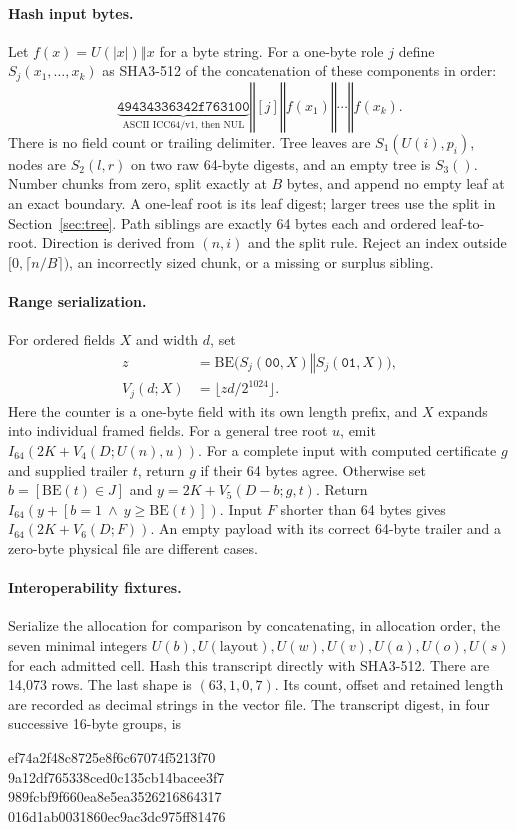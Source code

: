 \documentclass[10pt,twocolumn,letterpaper]{article}
\newcommand{\cat}{\mathbin\Vert}
\begin{document}
\paragraph{Hash input bytes.}
Let \(f(x)=U(|x|)\cat x\) for a byte string. For a one-byte role \(j\) define \(S_j(x_1,\ldots,x_k)\) as SHA3-512 of the concatenation of these components in order:
\[
 \underbrace{\mathtt{49434336342f763100}}_{\text{ASCII ICC64/v1, then NUL}}
 \cat [j]\cat f(x_1)\cat\cdots\cat f(x_k).
\]
There is no field count or trailing delimiter. Tree leaves are \(S_1(U(i),p_i)\), nodes are \(S_2(l,r)\) on two raw 64-byte digests, and an empty tree is \(S_3()\). Number chunks from zero, split exactly at \(B\) bytes, and append no empty leaf at an exact boundary. A one-leaf root is its leaf digest; larger trees use the split in Section~\ref{sec:tree}. Path siblings are exactly 64 bytes each and ordered leaf-to-root. Direction is derived from \((n,i)\) and the split rule. Reject an index outside \([0,\lceil n/B\rceil)\), an incorrectly sized chunk, or a missing or surplus sibling.

\paragraph{Range serialization.}
For ordered fields \(X\) and width \(d\), set
\begin{align*}
 z&=\mathrm{BE}\big(S_j(\mathtt{00},X)\cat S_j(\mathtt{01},X)\big),\\
 V_j(d;X)&=\lfloor zd/2^{1024}\rfloor .
\end{align*}
Here the counter is a one-byte field with its own length prefix, and \(X\) expands into individual framed fields. For a general tree root \(u\), emit \(I_{64}(2K+V_4(D;U(n),u))\). For a complete input with computed certificate \(g\) and supplied trailer \(t\), return \(g\) if their 64 bytes agree. Otherwise set \(b=[\mathrm{BE}(t)\in J]\) and \(y=2K+V_5(D-b;g,t)\). Return \(I_{64}(y+[b=1\ \land\ y\ge\mathrm{BE}(t)])\). Input \(F\) shorter than 64 bytes gives \(I_{64}(2K+V_6(D;F))\). An empty payload with its correct 64-byte trailer and a zero-byte physical file are different cases.

\paragraph{Interoperability fixtures.}
Serialize the allocation for comparison by concatenating, in allocation order, the seven minimal integers \(U(b),U(\mathrm{layout}),U(w),U(v),U(a),U(o),U(s)\) for each admitted cell. Hash this transcript directly with SHA3-512. There are 14,073 rows. The last shape is \((63,1,0,7)\). Its count, offset and retained length are recorded as decimal strings in the vector file. The transcript digest, in four successive 16-byte groups, is
\begin{center}\small\ttfamily
ef74a2f48c8725e8f6c67074f5213f70\\
9a12df765338ced0c135cb14bacee3f7\\
989fcbf9f660ea8e5ea3526216864317\\
016d1ab0031860ec9ac3dc975ff81476
\end{center}
\end{document}
